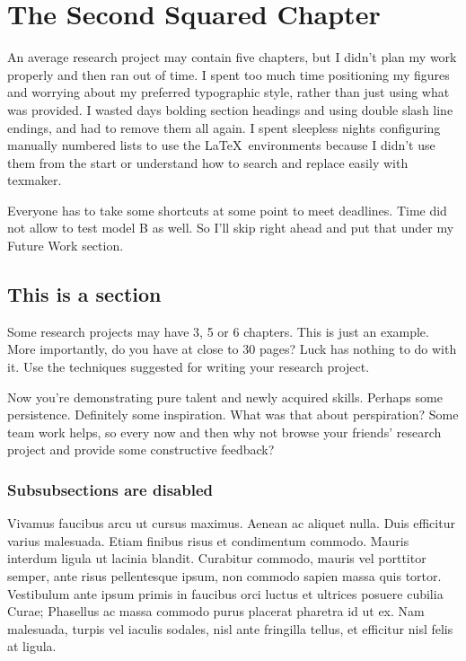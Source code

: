 \chapter{The Second Squared Chapter}

An average research project may contain five chapters, but I didn't plan my work properly
and then ran out of time. I spent too much time positioning my figures and worrying
about my preferred typographic style, rather than just using what was provided.
I wasted days bolding section headings and using double slash line endings, and 
had to remove them all again. I spent sleepless nights configuring manually numbered lists
to use the \LaTeX\ environments because I didn't use them from the start or understand
how to search and replace easily with texmaker.

Everyone has to take some shortcuts
at some point to meet deadlines. Time did not allow to test model 
B as well. So I'll skip right ahead and put that under my Future Work section.


\section{This is a section} 

Some research projects may have 3, 5 or 6 chapters. This is just an example. 
More importantly, do you have at close to 30 pages?  
Luck has nothing to do with it. Use the techniques suggested for
writing your research project.

Now you're demonstrating pure talent and newly acquired skills. 
Perhaps some persistence. Definitely some inspiration. What was that about perspiration? 
Some team work helps, so every now and then why not browse your friends' research project and provide
some constructive feedback?

\subsection{Subsubsections are disabled}

Vivamus faucibus arcu ut cursus maximus. Aenean ac aliquet nulla. Duis efficitur varius malesuada. Etiam finibus risus et condimentum commodo. Mauris interdum ligula ut lacinia blandit. Curabitur commodo, mauris vel porttitor semper, ante risus pellentesque ipsum, non commodo sapien massa quis tortor. Vestibulum ante ipsum primis in faucibus orci luctus et ultrices posuere cubilia Curae; Phasellus ac massa commodo purus placerat pharetra id ut ex. Nam malesuada, turpis vel iaculis sodales, nisl ante fringilla tellus, et efficitur nisl felis at ligula. 
